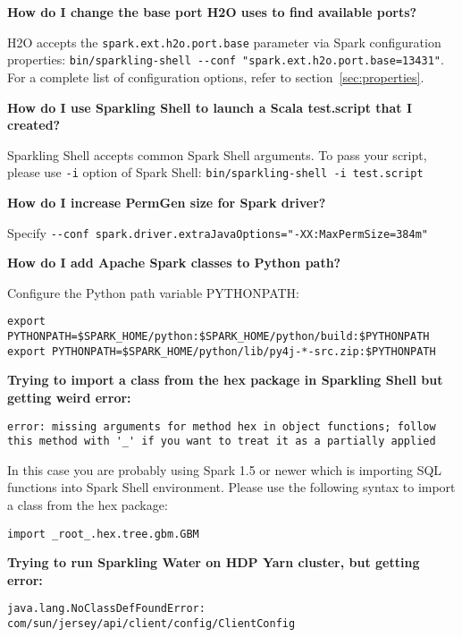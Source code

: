 \textbf{How do I change the base port H2O uses to find available ports?}

H2O accepts the \texttt{spark.ext.h2o.port.base} parameter via Spark configuration properties: {\lstinline[style=Bash]|bin/sparkling-shell --conf "spark.ext.h2o.port.base=13431"|}. For a complete list of configuration options, refer to section~\ref{sec:properties}.

\textbf{How do I use Sparkling Shell to launch a Scala test.script that I created?}

Sparkling Shell accepts common Spark Shell arguments. To pass your script, please use \texttt{-i} option of Spark Shell: {\lstinline[style=Bash]|bin/sparkling-shell -i test.script|}

\textbf{How do I increase PermGen size for Spark driver?}

Specify {\lstinline[style=Bash]|--conf spark.driver.extraJavaOptions="-XX:MaxPermSize=384m"|}

\textbf{How do I add Apache Spark classes to Python path?}

Configure the Python path variable PYTHONPATH:
        
\begin{lstlisting}[style=Bash]
export PYTHONPATH=$SPARK_HOME/python:$SPARK_HOME/python/build:$PYTHONPATH
export PYTHONPATH=$SPARK_HOME/python/lib/py4j-*-src.zip:$PYTHONPATH
\end{lstlisting}

\textbf{Trying to import a class from the hex package in Sparkling Shell but getting weird error:}

\begin{lstlisting}[style=Scala]
error: missing arguments for method hex in object functions; follow this method with '_' if you want to treat it as a partially applied
\end{lstlisting}

In this case you are probably using Spark 1.5 or newer which is importing SQL functions into Spark Shell environment. Please use the following syntax to import a class from the hex package:
\begin{lstlisting}[style=Scala]
import _root_.hex.tree.gbm.GBM
\end{lstlisting}


\textbf{Trying to run Sparkling Water on HDP Yarn cluster, but getting error:}

\begin{lstlisting}[style=Scala]
java.lang.NoClassDefFoundError: com/sun/jersey/api/client/config/ClientConfig
\end{lstlisting}

